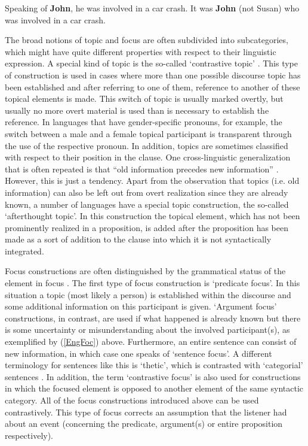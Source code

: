 \eal
\ex\label{EngTop}Speaking of \textbf{John}, he was involved in a car crash.
\ex\label{EngFoc}It was \textbf{John} (not Susan) who was involved in a car crash.
\zl{}

The broad notions of topic and focus are often subdivided into subcategories, which might have quite different properties with respect to their linguistic expression. 
A special kind of topic is the so-called `contrastive topic' \citep[291--296]{Lambrecht:1994}. 
This type of construction is used in cases where more than one possible discourse topic has been established and after referring to one of them, reference to another of these topical elements is made. 
This switch of topic is usually marked overtly, but usually no more overt material is used than is necessary to establish the reference. 
In languages that have gender-specific pronouns, for example, the switch between a male and a female topical participant is transparent through the use of the respective pronoun.
In addition, topics are sometimes classified with respect to their position in the clause. 
One cross-linguistic generalization that is often repeated is that ``old information precedes new information'' \citep[119]{Ward:2001}. 
However, this is just a tendency. 
Apart from the observation that topics (i.e. old information) can also be left out from overt realization since they are already known, a number of languages have a special topic construction, the so-called `afterthought topic'. 
In this construction the topical element, which has not been prominently realized in a proposition, is added after the proposition has been made as a sort of addition to the clause into which it is not syntactically integrated.  

Focus constructions are often distinguished by the grammatical status of the element in focus \citep[226--235]{Lambrecht:1994}. 
The first type of focus construction is `predicate focus'. 
In this situation a topic (most likely a person) is established within the discourse and some additional information on this participant is given. 
`Argument focus' constructions, in contrast, are used if what happened is already known but there is some uncertainty or misunderstanding about the involved participant(s), as exemplified by (\ref{EngFoc}) above.
Furthermore, an entire sentence can consist of new information, in which case one speaks of `sentence focus'.
A different terminology for sentences like this is `thetic', which is contrasted with `categorial' sentences \citep{Sasse:1987}.
In addition, the term `contrastive focus' is also used for constructions in which the focused element is opposed to another element of the same syntactic category. 
All of the focus constructions introduced above can be used contrastively. 
This type of focus corrects an assumption that the listener had about an event (concerning the predicate, argument(s) or entire proposition respectively).

